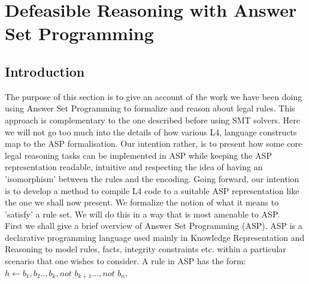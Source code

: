 \section{Defeasible Reasoning with Answer Set Programming}\label{sec:defeasible_asp}



\subsection{Introduction}
The purpose of this section is to give an account of the work we have been doing using Answer Set Programming to formalize and reason about legal rules. This approach is complementary to the one described before using SMT solvers. Here we will not go too much into the details of how various L4, language constructs map to the ASP formalisation. Our intention rather, is to present how some core legal reasoning tasks can be implemented in ASP while keeping the ASP representation readable, intuitive and respecting the idea of having an 'isomorphism' between the rules and the encoding. Going forward, our intention is to develop a method to compile L4 code to a suitable ASP representation like the one we shall now present. We formalize the notion of what it means to 'satisfy' a rule set. We will do this in a way that is most amenable to ASP.\\

First we shall give a brief overview of Answer Set Programming (ASP). ASP is a declarative programming language used mainly in Knowledge Representation and Reasoning to model rules, facts, integrity constraints etc. within a particular scenario that one wishes to consider. A rule in ASP has the form:\\
\newline
$h\leftarrow b_{1},b_{2}..,b_{k},not$ $b_{k+1}...,not$ $b_{n}.$\\

